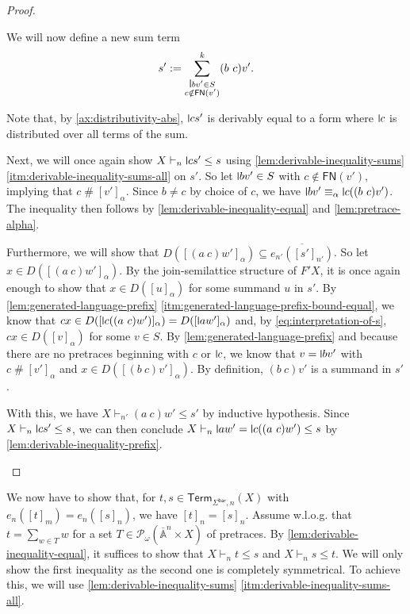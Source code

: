 \documentclass[11pt,a4paper]{amsart}
\newcommand{\Br}{\mathsf{bar}}
\newcommand{\Term}{\mathsf{Term}}
\newcommand{\FN}{\mathsf{FN}}
\newcommand{\Names}{\mathbb{A}}
\newcommand{\barNames}{\overline{\Names}}
\newcommand{\alphaeq}{\equiv_\alpha}
\newcommand{\pow}{\mathcal{P}}
\newcommand{\powf}{\pow_{\omega}}
\newcommand{\fresh}{\mathbin{\#}}
\theoremstyle{plain}
\newcommand{\midmid}{\hspace{0.2ex}{\rule[-0.1ex]{0.6pt}{1.65ex}}\hspace{0.2ex}}
\newcommand{\newletter}[1]{{\midmid}#1}
\numberwithin{equation}{section}
\newcommand{\+}[1]{\mathcal{#1}\xspace}
\theoremstyle{definition}
\begin{document}
\begin{proof}
\begin{itemize}
        We will now define a new sum term
        \begin{equation*}
          s' := \sum_{\substack{\newletter{b}v' \in S \\ c \notin \FN(v')}}^k (b\ c)v'.
        \end{equation*}

        Note that, by \eqref{ax:distributivity-abs}, \(\newletter{c}s'\) is derivably equal to a form where \(\newletter{c}\) is distributed over all terms of the sum.

        Next, we will once again show \(X \vdash_n \newletter{c}s' \le s\) using \cref{lem:derivable-inequality-sums} \eqref{itm:derivable-inequality-sums-all} on \(s'\).
        So let \(\newletter{b}v' \in S\) with \(c \notin \FN(v')\), implying that \(c \fresh [v']_\alpha\).
        Since \(b \neq c\) by choice of \(c\), we have \(\newletter{b}v' \alphaeq \newletter{c}((b\ c)v')\).
        The inequality then follows by \cref{lem:derivable-inequality-equal} and \cref{lem:pretrace-alpha}.

        Furthermore, we will show that \(D([(a\ c)w']_\alpha) \subseteq \overline{e_{n'}([s']_{n'})}\).
        So let \(x \in D([(a\ c)w']_\alpha)\).
        By the join-semilattice structure of \(F' X\), it is once again enough to show that \(x \in D([u]_\alpha)\) for some summand \(u\) in \(s'\).
        By \cref{lem:generated-language-prefix} \eqref{itm:generated-language-prefix-bound-equal}, we know that \(cx \in D([\newletter{c}((a\ c)w')]_\alpha) = D([\newletter{a}w']_\alpha)\) and, by \eqref{eq:interpretation-of-s}, \(cx \in D([v]_\alpha)\) for some \(v \in S\).
        By \cref{lem:generated-language-prefix} and because there are no pretraces beginning with \(c\) or \(\newletter{c}\), we know that \(v = \newletter{b}v'\) with \(c \fresh [v']_\alpha\) and \(x \in D([(b\ c)v']_\alpha)\).
        By definition, \((b\ c)v'\) is a summand in \(s'\).

        With this, we have \(X \vdash_{n'} (a\ c)w' \le s'\) by inductive hypothesis.
        Since \(X \vdash_n \newletter{c}s' \le s\), we can then conclude \(X \vdash_n \newletter{a}w' = \newletter{c}((a\ c)w') \le s\) by \cref{lem:derivable-inequality-prefix}.
  \end{itemize}
\end{proof}

\noindent We now have to show that, for \(t, s \in \Term_{\Sigma^\Br, n}(X)\) with \(e_n([t]_m) = e_n([s]_n)\), we have \([t]_n = [s]_n\).
Assume w.l.o.g. that \(t = \sum_{w \in T} w\) for a set \(T \in \powf(\barNames^n \times X)\) of pretraces.
By \cref{lem:derivable-inequality-equal}, it suffices to show that \(X \vdash_n t \le s\) and \(X \vdash_n s \le t\).
We will only show the first inequality as the second one is completely symmetrical.
To achieve this, we will use \cref{lem:derivable-inequality-sums} \eqref{itm:derivable-inequality-sums-all}.
\end{document}

